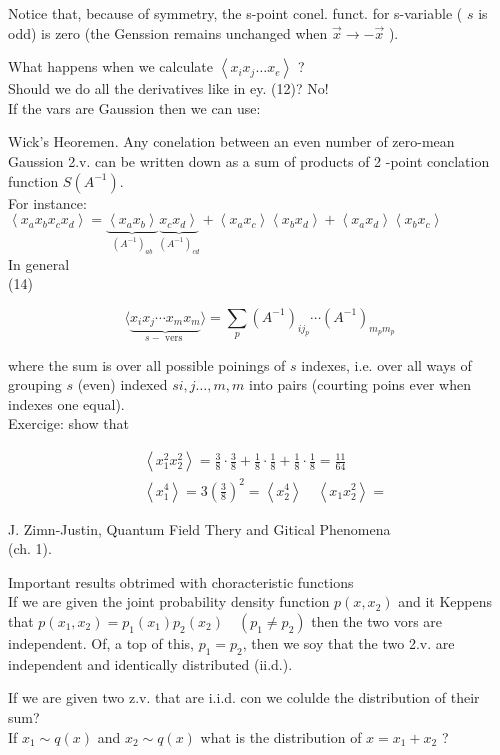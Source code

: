 \documentclass[10pt]{article}
\begin{document}
Notice that, because of symmetry, the s-point conel. funct. for s-variable ( $s$ is odd) is zero (the Genssion remains unchanged when $\vec{x} \rightarrow-\vec{x}$ ).

What happens when we calculate $\left\langle x_{i} x_{j} \ldots x_{e}\right\rangle$ ?\\
Should we do all the derivatives like in ey. (12)? No!\\
If the vars are Gaussion then we can use:

Wick's Heoremen. Any conelation between an even number of zero-mean Gaussion 2.v. can be written down as a sum of products of 2 -point conclation function $S\left(A^{-1}\right)$.\\
For instance:\\
$\left\langle x_{a} x_{b} x_{c} x_{d}\right\rangle=\underbrace{\left\langle x_{a} x_{b}\right\rangle}_{\left(A^{-1}\right)_{a b}} \underbrace{\left.x_{c} x_{d}\right\rangle}_{\left(A^{-1}\right)_{c d}}+\left\langle x_{a} x_{c}\right\rangle\left\langle x_{b} x_{d}\right\rangle+\left\langle x_{a} x_{d}\right\rangle\left\langle x_{b} x_{c}\right\rangle$\\
In general\\
(14)

$$
\langle\underbrace{x_{i} x_{j} \cdots x_{m} x_{m}}_{s-\text { vers }}\rangle=\sum_{p}\left(A^{-1}\right)_{i j_{p}} \cdots\left(A^{-1}\right)_{m_{p} m_{p}}
$$

where the sum is over all possible poinings of $s$ indexes, i.e. over all ways of grouping $s$ (even) indexed $s i, j \ldots, m, m$ into pairs (courting poins ever when indexes one equal).\\
Exercige: show that

$$
\begin{aligned}
& \left\langle x_{1}^{2} x_{2}^{2}\right\rangle=\frac{3}{8} \cdot \frac{3}{8}+\frac{1}{8} \cdot \frac{1}{8}+\frac{1}{8} \cdot \frac{1}{8}=\frac{11}{64} \\
& \left\langle x_{1}^{4}\right\rangle=3\left(\frac{3}{8}\right)^{2}=\left\langle x_{2}^{4}\right\rangle \quad\left\langle x_{1} x_{2}^{2}\right\rangle=
\end{aligned}
$$

J. Zimn-Justin, Quantum Field Thery and Gitical Phenomena\\
(ch. 1).

Important results obtrimed with choracteristic functions\\
If we are given the joint probability density function $p\left(x, x_{2}\right)$ and it Keppens that $p\left(x_{1}, x_{2}\right)=p_{1}\left(x_{1}\right) p_{2}\left(x_{2}\right) \quad\left(p_{1} \neq p_{2}\right)$ then the two vors are independent. Of, a top of this, $p_{1}=p_{2}$, then we soy that the two 2.v. are independent and identically distributed (ii.d.).

If we are given two z.v. that are i.i.d. con we colulde the distribution of their sum?\\
If $x_{1} \sim q(x)$ and $x_{2} \sim q(x)$ what is the distribution of $x=x_{1}+x_{2}$ ?
\end{document}

